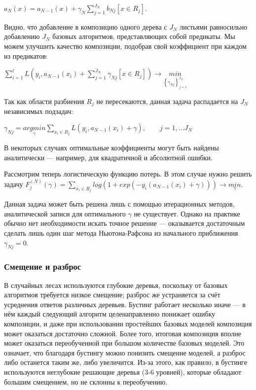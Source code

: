 \documentclass{article}
\theoremstyle{definition}
\theoremstyle{theorem}
\theoremstyle{remark}
\theoremstyle{theorem}
\theoremstyle{example}
\theoremstyle{theorem}
\theoremstyle{theorem}
\theoremstyle{theorem}
\theoremstyle{theorem}
\begin{document}
$a_N(x) = a_{N-1}(x) + \gamma_N \sum_{j=1}^{J_N}b_{Nj}[x\in R_j]$.

Видно, что добавление в композицию одного дерева с $J_N$ листьями равносильно добавлению $J_N$ базовых алгоритмов, представляющих собой предикаты. Мы можем улучшить качество композиции, подобрав свой коэффициент при каждом из предикатов: 

$\sum_{i=1}^{l} L\left(y_i,a_{N-1}(x_i) + \sum_{j=1}^{J_N} \gamma_{Nj}[x\in R_j]\right) \rightarrow \underset{\left\{\gamma_{Nj}\right\}^{J_N}_{j=1}}{min}$

Так как области разбиения $R_j$ не пересекаются, данная задача распадается на $J_N$ независимых подзадач:

$\gamma_{Nj} = \underset{\gamma}{argmin} \sum_{x_i \in R_j} L(y_i, a_{N-1}(x_i) + \gamma), \qquad j=1,\ldots J_N$

В некоторых случаях оптимальные коэффициенты могут быть найдены аналитически --- например, для квадратичной и абсолютной ошибки.

Рассмотрим теперь логистическую функцию потерь. В этом случае нужно решить задачу
$F_j^{(N)}(\gamma) = \sum_{x_i \in R_j} log(1 + exp(-y_i(a_{N-1}(x_i) + \gamma))) \rightarrow \underset{\gamma}{min}$.

Данная задача может быть решена лишь с помощью итерационных методов, аналитической записи для оптимального $\gamma$ не существует. Однако на практике обычно нет необходимости искать точное решение — оказывается достаточным сделать лишь один шаг метода Ньютона-Рафсона из начального приближения $\gamma_{Nj} = 0$. 

\subsubsection{Смещение и разброс}

В случайных лесах используются глубокие деревья, поскольку от базовых алгоритмов требуется низкое смещение; разброс же устраняется за счёт усреднения ответов различных деревьев. Бустинг работает несколько иначе — в
нём каждый следующий алгоритм целенаправленно понижает ошибку композиции, и даже при использовании простейших базовых моделей композиция может оказаться достаточно сложной. Более того, итоговая композиция вполне может оказаться переобученной при большом количестве базовых моделей. Это означает, что благодаря бустингу можно понизить смещение моделей, а разброс либо останется таким же, либо увеличится. Из-за этого, как правило, в бустинге используются неглубокие решающие деревья (3-6 уровней), которые обладают большим смещением, но не
склонны к переобучению.
\end{document}
